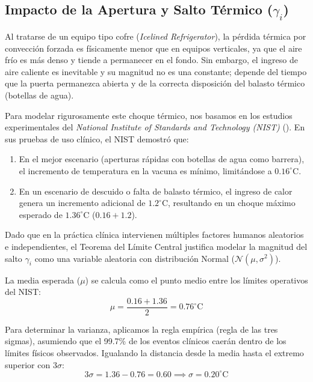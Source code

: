 \documentclass[
  spanish,
  us-letterpaper,
]{scrreprt}
\providecommand{\tightlist}{%
  \setlength{\itemsep}{0pt}\setlength{\parskip}{0pt}}
\numberwithin{equation}{section}
\theoremstyle{plain}
\theoremstyle{plain}
\theoremstyle{definition}
\theoremstyle{plain}
\theoremstyle{remark}
\begin{document}
\subsection{\texorpdfstring{Impacto de la Apertura y Salto Térmico
(\(\gamma_i\))}{Impacto de la Apertura y Salto Térmico (\textbackslash gamma\_i)}}\label{sec-salto-termico}

Al tratarse de un equipo tipo cofre (\emph{Icelined Refrigerator}), la
pérdida térmica por convección forzada es físicamente menor que en
equipos verticales, ya que el aire frío es más denso y tiende a
permanecer en el fondo. Sin embargo, el ingreso de aire caliente es
inevitable y su magnitud no es una constante; depende del tiempo que la
puerta permanezca abierta y de la correcta disposición del balasto
térmico (botellas de agua).

Para modelar rigurosamente este choque térmico, nos basamos en los
estudios experimentales del \emph{National Institute of Standards and
Technology (NIST)} (). En sus pruebas de uso clínico, el NIST demostró que:

\begin{enumerate}
\def\labelenumi{\arabic{enumi}.}
\tightlist
\item
  En el mejor escenario (aperturas rápidas con botellas de agua como
  barrera), el incremento de temperatura en la vacuna es mínimo,
  limitándose a \textbf{\(0.16^\circ\text{C}\)}.
\item
  En un escenario de descuido o falta de balasto térmico, el ingreso de
  calor genera un incremento adicional de \(1.2^\circ\text{C}\),
  resultando en un choque máximo esperado de
  \textbf{\(1.36^\circ\text{C}\)} (\(0.16 + 1.2\)).
\end{enumerate}

Dado que en la práctica clínica intervienen múltiples factores humanos
aleatorios e independientes, el Teorema del Límite Central justifica
modelar la magnitud del salto \(\gamma_i\) como una variable aleatoria
con distribución Normal (\(\mathcal{N}(\mu, \sigma^2)\)).

La media esperada (\(\mu\)) se calcula como el punto medio entre los
límites operativos del NIST:
\[\mu = \frac{0.16 + 1.36}{2} = 0.76^\circ\text{C}\]

Para determinar la varianza, aplicamos la regla empírica (regla de las
tres sigmas), asumiendo que el 99.7\% de los eventos clínicos caerán
dentro de los límites físicos observados. Igualando la distancia desde
la media hasta el extremo superior con \(3\sigma\):
\[3\sigma = 1.36 - 0.76 = 0.60 \implies \sigma = 0.20^\circ\text{C}\]
\end{document}
